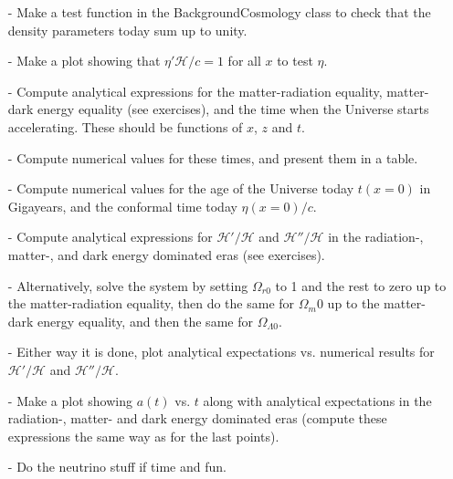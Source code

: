 \documentclass{aa}
\begin{document}
\begin{enumerate}
  \item [-] Make a test function in the BackgroundCosmology class to check that the density parameters today sum up to unity.
  \item [-] Make a plot showing that $\eta'\mathcal{H}/c=1$ for all $x$ to test $\eta$.
  \item [-] Compute analytical expressions for the matter-radiation equality, matter-dark energy equality (see exercises), and the time when the Universe starts accelerating. These should be functions of $x$, $z$ and $t$.
  \item [-] Compute numerical values for these times, and present them in a table.
  \item [-] Compute numerical values for the age of the Universe today $t(x=0)$ in Gigayears, and the conformal time today $\eta(x=0)/c$.
  \item [-] Compute analytical expressions for $\mathcal{H}'/\mathcal{H}$ and $\mathcal{H}''/\mathcal{H}$ in the radiation-, matter-, and dark energy dominated eras (see exercises).
  \item [-] Alternatively, solve the system by setting $\Omega_{r0}$ to 1 and the rest to zero up to the matter-radiation equality, then do the same for $\Omega_m0$ up to the matter-dark energy equality, and then the same for $\Omega_{\Lambda0}$.
  \item [-] Either way it is done, plot analytical expectations vs. numerical results for $\mathcal{H}'/\mathcal{H}$ and $\mathcal{H}''/\mathcal{H}$.
  \item [-] Make a plot showing $a(t)$ vs. $t$ along with analytical expectations in the radiation-, matter- and dark energy dominated eras (compute these expressions the same way as for the last points).
  \item [-] Do the neutrino stuff if time and fun. 
\end{enumerate}
\end{document}
